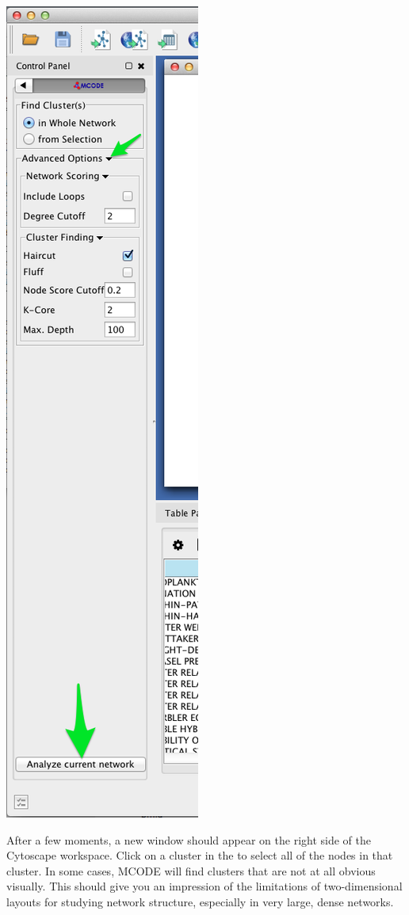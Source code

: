 \documentclass[letterpaper,10pt,english]{sphinxmanual}
\begin{document}
{\hfill\includegraphics{cyto.7.png}\hfill}

After a few moments, a new window should appear on the right side of the Cytoscape
workspace. Click on a cluster in the  to select all of the nodes in
that cluster. In some cases, MCODE will find clusters that are not at all obvious
visually. This should give you an impression of the limitations of two-dimensional
layouts for studying network structure, especially in very large, dense networks.
\end{document}
